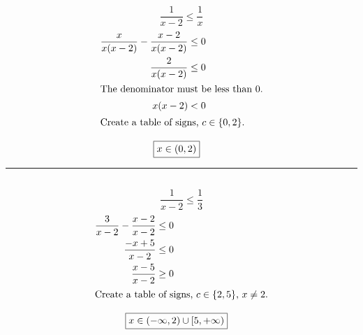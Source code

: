 	\subsection{}
		\[\frac{1}{x - 2} \leq \frac{1}{x}\]
		\begin{align*}
			\frac{x}{x(x - 2)} - \frac{x - 2}{x(x - 2)} &\leq 0 \\
			\frac{2}{x(x - 2)} &\leq 0 \\
			\intertext{The denominator must be less than 0.}
			x(x - 2) &< 0 \\
			\intertext{Create a table of signs, $c \in \{0, 2\}$.}
		\end{align*}
		\begin{center}\end{center}
		\begin{align*}
			\Aboxed{x &\in (0, 2)}
		\end{align*}
		\hrule{}

	\subsection{}
		\[\frac{1}{x - 2} \leq \frac{1}{3}\]
		\begin{align*}
			\frac{3}{x - 2} - \frac{x - 2}{x - 2} &\leq 0 \\
			\frac{-x + 5}{x - 2} &\leq 0 \\
			\frac{x - 5}{x - 2} &\geq 0 \\
			\intertext{Create a table of signs, $c \in \{2, 5\}$, $x \neq 2$.}
		\end{align*}
		\begin{center}\end{center}
		\begin{align*}
			\Aboxed{x &\in (-\infty, 2) \cup [5, +\infty)}
		\end{align*}
		\pagebreak{}


